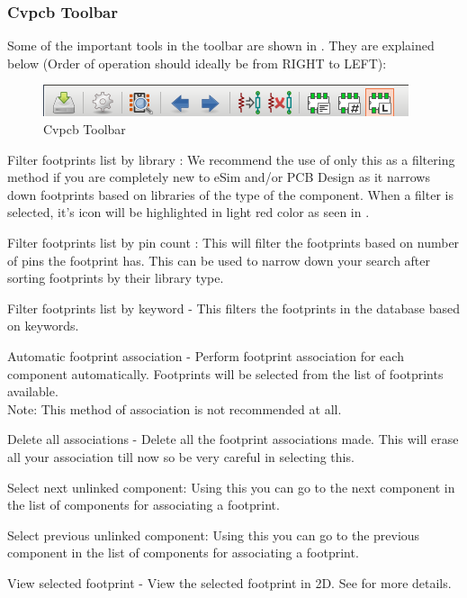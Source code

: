 \subsubsection{ Cvpcb Toolbar}
Some of the important tools in the toolbar are shown in
. They are explained below (Order of operation should ideally be from RIGHT to LEFT):
\begin{figure}
\centering
\includegraphics[width=\hgfig]{tb_fe.png}
\caption{Cvpcb Toolbar}
\label{tb_fe}
\end{figure}
\begin{compactenum}
\item Filter footprints list by library : We recommend the use of only this as a filtering method if you are completely new to eSim and/or PCB Design as it narrows down footprints based on libraries of the type of the component. When a filter is selected, it's icon will be highlighted in light red color as seen in .
\item Filter footprints list by pin count : This will filter the footprints based on number of pins the footprint has. This can be used to narrow down your search after sorting footprints by their library type.
\item Filter footprints list by keyword - This filters the footprints in the database based on keywords.
\item Automatic footprint association - Perform footprint association
  for each component automatically. Footprints will be selected from
  the list of footprints available.\\
  Note: This method of association is not recommended at all.
\item Delete all associations - Delete all the footprint associations made. This will erase all your association till now so be very careful in selecting this.
 \item Select next unlinked component: Using this you can go to the next component in the list of components for associating a footprint.
 \item Select previous unlinked component: Using this you can go to the previous component in the list of components for associating a footprint.
\item View selected footprint - View the selected footprint in 2D. See  for more details. \\

\end{compactenum}
